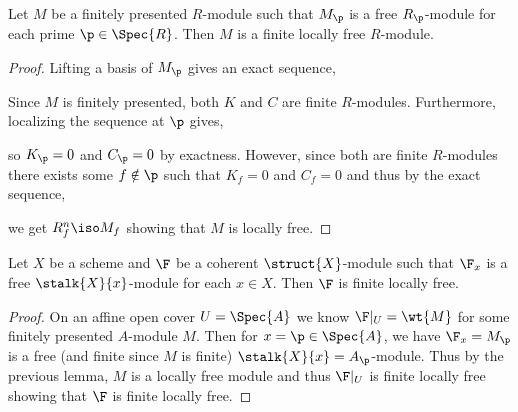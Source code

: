\documentclass[12pt]{article}
\begin{document}
\begin{lemma}
Let $M$ be a finitely presented $R$-module such that $M_\p$ is a free $R_\p$-module for each prime $\p \in \Spec{R}$. Then $M$ is a finite locally free $R$-module.
\end{lemma}

\begin{proof}
Lifting a basis of $M_\p$ gives an exact sequence,
\begin{center}
\end{center}
Since $M$ is finitely presented, both $K$ and $C$ are finite $R$-modules. Furthermore, localizing the sequence at $\p$ gives,
\begin{center}
\end{center}
so $K_\p = 0$ and $C_\p = 0$ by exactness. However, since both are finite $R$-modules there exists some $f \notin \p$ such that $K_f = 0$ and $C_f = 0$ and thus by the exact sequence,
\begin{center}
\end{center}
we get $R^n_f \iso M_f$ showing that $M$ is locally free.
\end{proof}

\begin{lemma}
Let $X$ be a scheme and $\F$ be a coherent $\struct{X}$-module such that $\F_x$ is a free $\stalk{X}{x}$-module for each $x \in X$. Then $\F$ is finite locally free.
\end{lemma}

\begin{proof}
On an affine open cover $U = \Spec{A}$ we know $\F|_U = \wt{M}$ for some finitely presented $A$-module $M$. Then for $x = \p \in \Spec{A}$, we have $\F_x = M_\p$ is a free (and finite since $M$ is finite) $\stalk{X}{x} = A_\p$-module. Thus by the previous lemma, $M$ is a locally free module and thus $\F|_U$ is finite locally free showing that $\F$ is finite locally free.
\end{proof}
\end{document}
